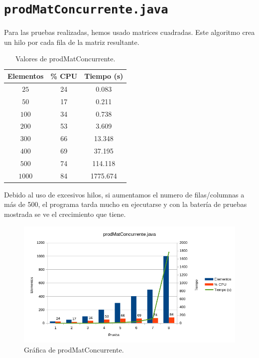 \documentclass[12pt,letterpaper]{article}
\begin{document}
\newpage
\section{\texttt{prodMatConcurrente.java}}

Para las pruebas realizadas, hemos usado matrices cuadradas. Este algoritmo crea un hilo por cada fila de la matriz resultante.
\begin{center}
	\begin{table}[htbp]
		\begin{center}
			\begin{tabular}{|c|c|c|}
				\hline
				\textbf{Elementos} & \textbf{\% CPU} & \textbf{Tiempo (s)}  \\
				\hline 
				$25$ & 24 & 0.083\\ \hline
				$50$ & 17 & 0.211\\ \hline
				$100$ & 34 & 0.738\\ \hline	
				$200$ & 53 & 3.609 \\ \hline 
				$300$ & 66 & 13.348 \\ \hline 
				$400$ & 69 & 37.195 \\ \hline 
				$500$ & 74 & 114.118\\ \hline
				$1000$ & 84 & 1775.674 \\ \hline
			\end{tabular}
			\caption{Valores de prodMatConcurrente.}
			\label{tabla:Valores de prodMatConcurrente}
		\end{center}
	\end{table}
\end{center}

Debido al uso de excesivos hilos, si aumentamos el numero de filas/columnas a más de 500, el programa tarda mucho en ejecutarse y con la batería de pruebas mostrada se ve el crecimiento que tiene.
\begin{figure}[h]
	\begin{center}
		\includegraphics[scale=0.8]{prodMatConcurrente.png}
		\caption{Gráfica de prodMatConcurrente.}
		\label{fig: Gráfica de prodMatConcurrente}
	\end{center}	
\end{figure}
\end{document}
